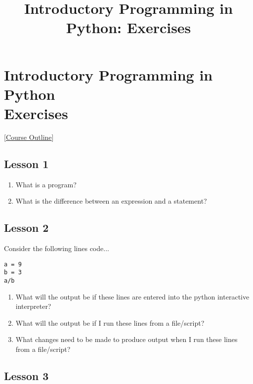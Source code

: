 \documentclass[a4paper,11pt]{article}
\title{Introductory Programming in Python: Exercises}
\begin{document}
\section{Introductory Programming in Python
\\   Exercises}    [\href{index.html}{Course Outline}]
\\    [\href{solutions}{Solutions}]   

\subsection{Lesson 1}

\begin{enumerate}
	\item What is a program?
	\item What is the difference between an expression and a    statement?
\end{enumerate}

\subsection{Lesson 2}


Consider the following lines code...
\begin{lstlisting}
a = 9
b = 3
a/b\end{lstlisting}
\begin{enumerate}
	\item What will the output be if these lines are entered into the     python interactive interpreter?
	\item What will the output be if I run these lines from a     file/script?
	\item What changes need to be made to produce output when I run     these lines from a file/script?
\end{enumerate}

\subsection{Lesson 3}
\end{document}
